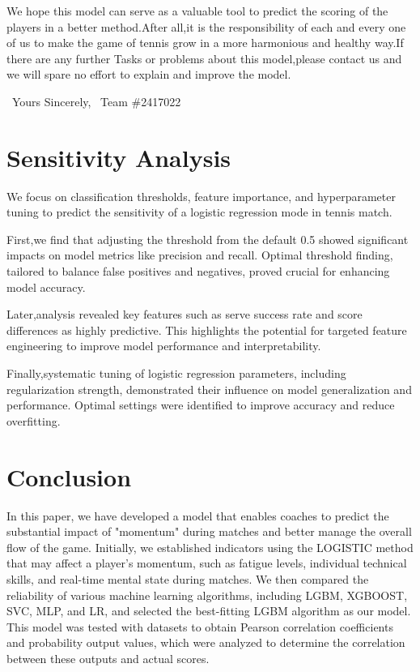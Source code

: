 \documentclass[12pt]{article}
\begin{document}
We hope this model can serve as a valuable tool to predict the scoring of the players in a better method.After all,it is the responsibility of each and every one of us to make the game of tennis grow in a more harmonious and healthy way.If there are any further Tasks or problems about this model,please contact us and we will spare no effort to explain and improve the model.

\ Yours Sincerely,
\ Team \#2417022

\section{Sensitivity Analysis}
We focus on classification thresholds, feature importance, and hyperparameter tuning to predict the sensitivity of a logistic regression mode in tennis match.

First,we find that adjusting the threshold from the default 0.5 showed significant impacts on model metrics like precision and recall. Optimal threshold finding, tailored to balance false positives and negatives, proved crucial for enhancing model accuracy.

Later,analysis revealed key features such as serve success rate and score differences as highly predictive. This highlights the potential for targeted feature engineering to improve model performance and interpretability.

Finally,systematic tuning of logistic regression parameters, including regularization strength, demonstrated their influence on model generalization and performance. Optimal settings were identified to improve accuracy and reduce overfitting.


\section{Conclusion}
In this paper, we have developed a model that enables coaches to predict the substantial impact of "momentum" during matches and better manage the overall flow of the game. Initially, we established indicators using the LOGISTIC method that may affect a player's momentum, such as fatigue levels, individual technical skills, and real-time mental state during matches. We then compared the reliability of various machine learning algorithms, including LGBM, XGBOOST, SVC, MLP, and LR, and selected the best-fitting LGBM algorithm as our model. This model was tested with datasets to obtain Pearson correlation coefficients and probability output values, which were analyzed to determine the correlation between these outputs and actual scores. 
\end{document}
